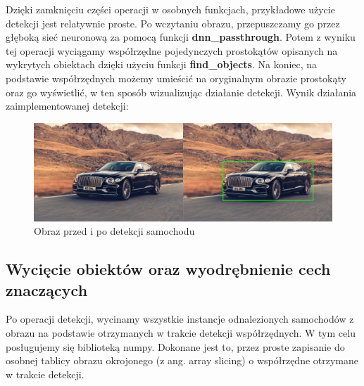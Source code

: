 Dzięki zamknięciu części operacji w osobnych funkcjach, przykładowe użycie detekcji jest relatywnie proste. Po wczytaniu obrazu, przepuszczamy go przez głęboką sieć neuronową za pomocą funkcji \textbf{dnn\_passthrough}. Potem z wyniku tej operacji wyciągamy współrzędne pojedynczych prostokątów opisanych na wykrytych obiektach dzięki użyciu funkcji \textbf{find\_objects}. Na koniec, na podstawie współrzędnych możemy umieścić na oryginalnym obrazie prostokąty oraz go wyświetlić, w ten sposób wizualizując działanie detekcji. Wynik działania zaimplementowanej detekcji:

\begin{figure}[h!]
    \begin{center}
        \includegraphics[scale=1.43]{img/detection_visualization.jpg}
    \end{center}
    \caption{Obraz przed i po detekcji samochodu\protect\footnotemark}
    \label{fig:cnn_arch_pic}
\end{figure}


\subsection{Wycięcie obiektów oraz wyodrębnienie cech znaczących}
Po operacji detekcji, wycinamy wszystkie instancje odnalezionych samochodów z obrazu na podstawie otrzymanych w trakcie detekcji współrzędnych. W tym celu posługujemy się biblioteką numpy. Dokonane jest to, przez proste zapisanie do osobnej tablicy obrazu okrojonego (z ang. array slicing) o współrzędne otrzymane w trakcie detekcji.

